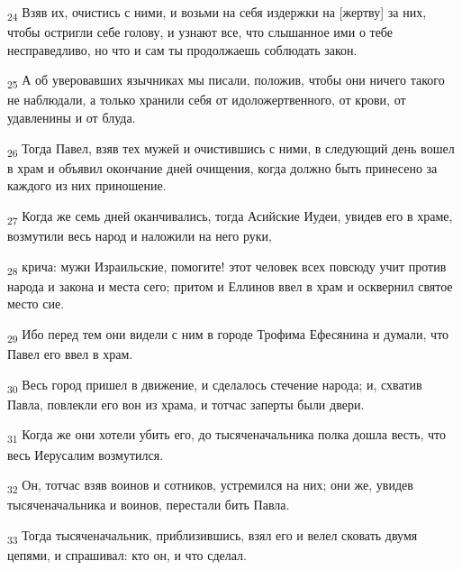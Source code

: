\begin{tcolorbox}
\textsubscript{24} Взяв их, очистись с ними, и возьми на себя издержки на [жертву] за них, чтобы остригли себе голову, и узнают все, что слышанное ими о тебе несправедливо, но что и сам ты продолжаешь соблюдать закон.
\end{tcolorbox}
\begin{tcolorbox}
\textsubscript{25} А об уверовавших язычниках мы писали, положив, чтобы они ничего такого не наблюдали, а только хранили себя от идоложертвенного, от крови, от удавленины и от блуда.
\end{tcolorbox}
\begin{tcolorbox}
\textsubscript{26} Тогда Павел, взяв тех мужей и очистившись с ними, в следующий день вошел в храм и объявил окончание дней очищения, когда должно быть принесено за каждого из них приношение.
\end{tcolorbox}
\begin{tcolorbox}
\textsubscript{27} Когда же семь дней оканчивались, тогда Асийские Иудеи, увидев его в храме, возмутили весь народ и наложили на него руки,
\end{tcolorbox}
\begin{tcolorbox}
\textsubscript{28} крича: мужи Израильские, помогите! этот человек всех повсюду учит против народа и закона и места сего; притом и Еллинов ввел в храм и осквернил святое место сие.
\end{tcolorbox}
\begin{tcolorbox}
\textsubscript{29} Ибо перед тем они видели с ним в городе Трофима Ефесянина и думали, что Павел его ввел в храм.
\end{tcolorbox}
\begin{tcolorbox}
\textsubscript{30} Весь город пришел в движение, и сделалось стечение народа; и, схватив Павла, повлекли его вон из храма, и тотчас заперты были двери.
\end{tcolorbox}
\begin{tcolorbox}
\textsubscript{31} Когда же они хотели убить его, до тысяченачальника полка дошла весть, что весь Иерусалим возмутился.
\end{tcolorbox}
\begin{tcolorbox}
\textsubscript{32} Он, тотчас взяв воинов и сотников, устремился на них; они же, увидев тысяченачальника и воинов, перестали бить Павла.
\end{tcolorbox}
\begin{tcolorbox}
\textsubscript{33} Тогда тысяченачальник, приблизившись, взял его и велел сковать двумя цепями, и спрашивал: кто он, и что сделал.
\end{tcolorbox}
